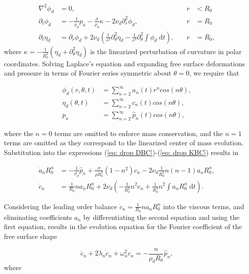 \begin{align}
 \nabla^2 \phi_d &= 0, \quad &r&<R_0 \\
    \partial_t \phi_d &= -\frac{1}{\rho_d}p_a - \frac{\sigma}{\rho_d} \kappa  - 2\nu_d\partial_r^2 \phi_d, \quad &r&=R_0 \label{eq: drop DBC}\\
    \partial_t \eta_d &= \partial_r \phi_d + 2 {\nu_d}\left(\frac{1}{r^2} \partial_\theta^2\eta_d - \frac{1}{r^3}\partial_\theta^2 \int \phi_d \;\text{d} t\right), \quad &r&=R_0, \label{eq: drop KBC}
\end{align}
where $\kappa = -\frac{1}{R^2_0}\left(\eta_d + \partial_\theta^2 \eta_d\right)$ is the linearized perturbation of curvature in polar coordinates. Solving Laplace's equation and expanding free surface deformations and pressure in terms of Fourier series symmetric about $\theta=0$, we require that

\begin{align}
    \phi_d(r, \theta, t) &= \sum_{n=2}^\infty a_n(t)r^n cos(n\theta), \\
    \eta_d(\theta, t) &= \sum_{n=2}^\infty c_n(t) cos(n\theta), \\
    p_a &= \sum_{n=2}^\infty \hat{p}_n(t) cos(n\theta),
\end{align}

where the $n=0$ terms are omitted to enforce mass conservation, and the $n=1$ terms are omitted as they correspond to the linearized center of mass evolution. Substitution into the expressions (\ref{eq: drop DBC})-(\ref{eq: drop KBC}) results in

\begin{align}
    \dot{a}_n R_0^n &= -\frac{1}{\rho_d}\hat{p}_n + \frac{\sigma}{\rho R_0^{2}} \left( 1-n^2\right)c_n - 2\nu_d \frac{1}{R_0^{2}}n(n-1)a_n R_0^n,\\
    \dot{c}_n &= \frac{1}{R_0} n a_n R_0^{n} + 2\nu_d \left(-\frac{1}{R_0^2}n^2 c_n  + \frac{1}{R_0^{3}} n^2  \int a_n R_0^n  \;\text{d}t\right). 
\end{align}
 
Considering the leading order balance $\dot{c}_n = \frac{1}{R_0} n a_n R_0^{n}$ into the viscous terms, and eliminating coefficients $a_n$ by differentiating the second equation and using the first equation, results in the evolution equation for the Fourier coefficient of the free surface shape 

\begin{equation}
    \ddot{c}_n + 2\lambda_n \dot{c}_n + \omega_n^2 c_n = -\frac{n}{\rho_d R_0}\hat{p}_n,
\end{equation}
where 


